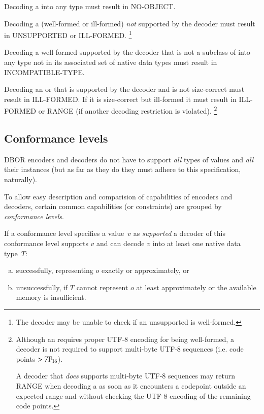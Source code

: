 Decoding a \DborNoneValue{} into any type must result in NO-OBJECT.

\medskip
Decoding a (well-formed or ill-formed) \DborValue{} \emph{not} supported by the decoder
must result in UNSUPPORTED or ILL-FORMED.%
\footnote{%
    The decoder may be unable to check if an unsupported \DborValue{} is well-formed.
}

\medskip
Decoding a well-formed \DborValue{} supported by the decoder that is not a subclass of \DborNumberValue{}
into any type not in its associated set of native data types must result in INCOMPATIBLE-TYPE.

\medskip
Decoding an \DborContainerValue{} or \DborUtfEightStringValue{} that is supported by the decoder and
is not size-correct must result in ILL-FORMED.
If it is size-correct but ill-formed it must result in ILL-FORMED or RANGE
(if another decoding restriction is violated).%
\footnote{%
    Although an \DborUtfEightStringValue{} requires proper UTF-8 encoding for being well-formed,
    a decoder is not required to support multi-byte UTF-8 sequences (i.e. code points $> \mathrm{7F}_{16}$).

    A decoder that \emph{does} supports multi-byte UTF-8 sequences
    may return RANGE when decoding a \DborUtfEightStringValue{} as soon as it encounters a codepoint outside
    an expected range and without checking the UTF-8 encoding of the remaining code points.
}


\subsection{Conformance levels}
\label{sec:conformancelevels}

DBOR encoders and decoders do not have to support \emph{all} types of values and \emph{all} their instances
(but as far as they do they must adhere to this specification, naturally).

To allow easy description and comparision of capabilities of encoders and decoders,
certain common capabilities (or constraints) are grouped by \emph{conformance levels}.

\medskip
If a conformance level specifies a value~$v$ as \emph{supported}
a decoder of this conformance level supports $v$ and can decode $v$ into at least one native data type~$T$:
\begin{enumerate}[a)]
    \item
    successfully, representing $o$ exactly or approximately, or

    \item
    unsuccessfully, if $T$ cannot represent $o$ at least approximately or
    the available memory is insufficient.
\end{enumerate}


